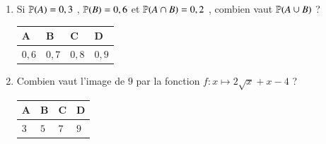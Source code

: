 \documentclass[oneside,12pt]{exam}          %
\begin{document}
\begin{enumerate}[label=\underline{Question \no\arabic*} :  , leftmargin=* , itemsep=5mm]
		

	\item Si ${\mathbb P}(A) = 0,3$ , ${\mathbb P}(B) = 0,6$ et ${\mathbb P}(A \cap B) = 0,2$ , combien vaut ${\mathbb P}(A \cup B)$ ?
	
		\hspace{\linewidth-\textwidth}
		\renewcommand{\arraystretch}{1.5}
		\begin{tabular}{| P{0.22\textwidth} | P{0.22\textwidth} | P{0.22\textwidth} | P{0.22\textwidth} |} \hline
			A & B & C & D \\ \hline
			$0,6$ & $0,7$ & $0,8$ & $0,9$ \\ \hline
		\end{tabular}
		
		

	\item Combien vaut l'image de $9$ par la fonction $f : x \mapsto 2\sqrt{x} + x - 4$ ?
	
		\hspace{\linewidth-\textwidth}
		\renewcommand{\arraystretch}{1.5}
		\begin{tabular}{| P{0.22\textwidth} | P{0.22\textwidth} | P{0.22\textwidth} | P{0.22\textwidth} |} \hline
			A & B & C & D \\ \hline
			$3$ & $5$ & $7$ & $9$ \\ \hline
		\end{tabular}	
		
\end{enumerate}
\end{document}

